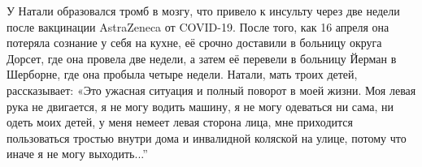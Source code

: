 У Натали образовался тромб в мозгу, что привело к инсульту через две недели
после вакцинации AstraZeneca от COVID-19. После того, как 16 апреля она потеряла
сознание у себя на кухне, её срочно доставили в больницу округа Дорсет, где она
провела две недели, а затем её перевели в больницу Йерман в Шерборне, где она
пробыла четыре недели. Натали, мать троих детей, рассказывает: «Это ужасная
ситуация и полный поворот в моей жизни. Моя левая рука не двигается, я не могу
водить машину, я не могу одеваться ни сама, ни одеть моих детей, у меня немеет
левая сторона лица, мне приходится пользоваться тростью внутри дома и инвалидной
коляской на улице, потому что иначе я не могу выходить...''
